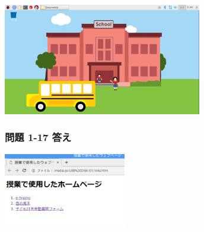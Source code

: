 \centering
\includegraphics[width=0.65\textwidth]{text01-img/textbook-img223.png}


\flushleft
\clearpage
\begin{minipage}{\textwidth}
  \subsubsection{\bfseries 問題 1-17 答え}

  \centering
  \includegraphics[width=0.4\textwidth]{text01-img/textbook-img224.png}
  \flushleft


\end{minipage}
